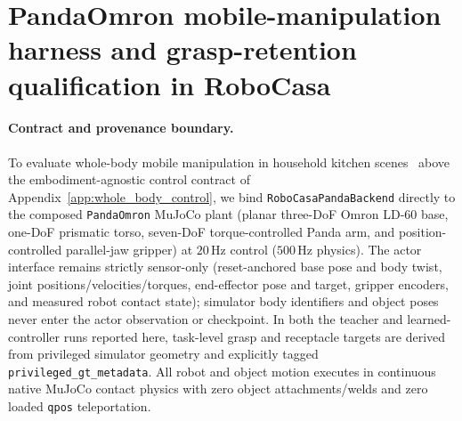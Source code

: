 \section{PandaOmron mobile-manipulation harness and grasp-retention qualification in RoboCasa}
\label{app:robocasa_wbc_pick_place}

\paragraph{Contract and provenance boundary.}
To evaluate whole-body mobile manipulation in household kitchen scenes~\cite{robocasa2024,nasiriany2026robocasa365}
above the embodiment-agnostic control contract of Appendix~\ref{app:whole_body_control},
we bind \texttt{RoboCasaPandaBackend} directly to the composed \texttt{PandaOmron}
MuJoCo plant (planar three-DoF Omron LD-60 base, one-DoF prismatic torso,
seven-DoF torque-controlled Panda arm, and position-controlled parallel-jaw
gripper) at $20\,\text{Hz}$ control ($500\,\text{Hz}$ physics).
The actor interface remains strictly sensor-only (reset-anchored base pose and
body twist, joint positions/velocities/torques, end-effector pose and target,
gripper encoders, and measured robot contact state); simulator body identifiers
and object poses never enter the actor observation or checkpoint.
In both the teacher and learned-controller runs reported here, task-level grasp
and receptacle targets are derived from privileged simulator geometry and
explicitly tagged \texttt{privileged\_gt\_metadata}. All robot and object motion
executes in continuous native MuJoCo contact physics with zero object
attachments/welds and zero loaded \texttt{qpos} teleportation.

